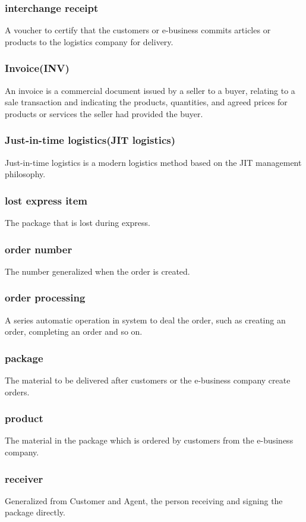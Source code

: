 \documentclass[12pt]{scrreprt}
\begin{document}
\begin{spacing}{0.7}
\subsubsection{interchange receipt}
A voucher to certify that the customers or e-business commits articles
or products to the logistics company for delivery.
\subsubsection{Invoice(INV)}
An invoice is a commercial document issued by a seller to a buyer,
relating to a sale transaction and indicating the products, quantities,
and agreed prices for products or services the seller had provided the buyer.
\subsubsection{Just-in-time logistics(JIT logistics)}
Just-in-time logistics is a modern logistics method based on the JIT
management philosophy.
\subsubsection{lost express item}
The package that is lost during express.
\subsubsection{order number}
The number generalized when the order is created.
\subsubsection{order processing}
A series automatic operation in system to deal the order, such as
creating an order, completing an order and so on.
\subsubsection{package}
The material to be delivered after customers or the e-business company
create orders.
\subsubsection{product}
The material in the package which is ordered by customers from the
e-business company.
\subsubsection{receiver}
Generalized from Customer and Agent, the person receiving and signing
the package directly.

\end{spacing}
\end{document}
